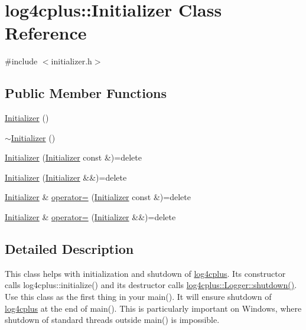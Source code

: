\hypertarget{classlog4cplus_1_1Initializer}{\section{log4cplus\-:\-:Initializer Class Reference}
\label{classlog4cplus_1_1Initializer}
}


{\ttfamily \#include $<$initializer.\-h$>$}

\subsection*{Public Member Functions}
\begin{DoxyCompactItemize}
\item 
\hyperlink{classlog4cplus_1_1Initializer_a4db9d2cbea4704fc8cbe452e59f37c4c}{Initializer} ()
\item 
\hyperlink{classlog4cplus_1_1Initializer_a63d9207254050c03b7853552e3229b71}{$\sim$\-Initializer} ()
\item 
\hyperlink{classlog4cplus_1_1Initializer_ad5b30413c875f4a0b358bdaf8aa9cc07}{Initializer} (\hyperlink{classlog4cplus_1_1Initializer}{Initializer} const \&)=delete
\item 
\hyperlink{classlog4cplus_1_1Initializer_ac5c4b7d0fda117f0940a43491c09eaac}{Initializer} (\hyperlink{classlog4cplus_1_1Initializer}{Initializer} \&\&)=delete
\item 
\hyperlink{classlog4cplus_1_1Initializer}{Initializer} \& \hyperlink{classlog4cplus_1_1Initializer_addaa55cd2f01f8eb574639101c172abb}{operator=} (\hyperlink{classlog4cplus_1_1Initializer}{Initializer} const \&)=delete
\item 
\hyperlink{classlog4cplus_1_1Initializer}{Initializer} \& \hyperlink{classlog4cplus_1_1Initializer_a6e10aaa5be2f92ac8dff4d4a75ec7b06}{operator=} (\hyperlink{classlog4cplus_1_1Initializer}{Initializer} \&\&)=delete
\end{DoxyCompactItemize}


\subsection{Detailed Description}
This class helps with initialization and shutdown of \hyperlink{namespacelog4cplus}{log4cplus}. Its constructor calls {\ttfamily log4cplus\-::initialize()} and its destructor calls {\ttfamily \hyperlink{classlog4cplus_1_1Logger_a9a288b93105766e0ad7bebbbf8c5ea2f}{log4cplus\-::\-Logger\-::shutdown()}}. Use this class as the first thing in your {\ttfamily main()}. It will ensure shutdown of \hyperlink{namespacelog4cplus}{log4cplus} at the end of {\ttfamily main()}. This is particularly important on Windows, where shutdown of standard threads outside {\ttfamily main()} is impossible. 

